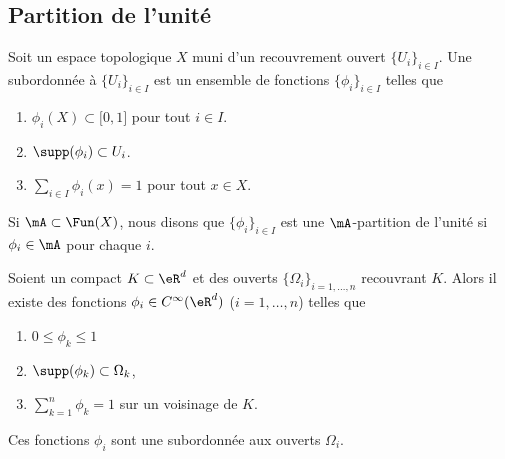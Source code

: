 \subsection{Partition de l'unité}

\begin{definition}	\label{DEFooEDFIooHKnGdE}
	Soit un espace topologique \( X\) muni d'un recouvrement ouvert \( \{ U_i \}_{i\in I}\). Une  subordonnée à \( \{ U_i \}_{i\in I}\) est un ensemble de fonctions \( \{ \phi_i \}_{i\in I}\) telles que
	\begin{enumerate}
		\item
		      \( \phi_i(X)\subset \mathopen[ 0,1\mathclose]\) pour tout \( i\in I\).
		\item
		      \( \supp(\phi_i)\subset U_i\).
		\item
		      \( \sum_{i\in I}\phi_i(x)=1\) pour tout \( x\in X\).
	\end{enumerate}
	Si \( \mA\subset\Fun(X)\), nous disons que \( \{ \phi_i \}_{i\in I}\) est une \( \mA\)-partition de l'unité si \( \phi_i\in\mA\) pour chaque \( i\).
\end{definition}


\begin{theorem}       \label{THOooQFCQooSlgLpz}
	Soient un compact \( K\subset \eR^d\) et des ouverts \( \{ \Omega_i \}_{i=1,\ldots, n}\) recouvrant \( K\). Alors il existe des fonctions \( \phi_i\in  C^{\infty}(\eR^d)\) (\( i=1,\ldots, n\)) telles que
	\begin{enumerate}
		\item
		      \( 0\leq \phi_k\leq 1\)
		\item
		      \( \supp(\phi_k)\subset \Omega_k\),
		\item
		      \( \sum_{k=1}^n\phi_k=1\) sur un voisinage de \( K\).
	\end{enumerate}
	Ces fonctions \( \phi_i\) sont une  subordonnée aux ouverts \( \Omega_i\).
\end{theorem}

